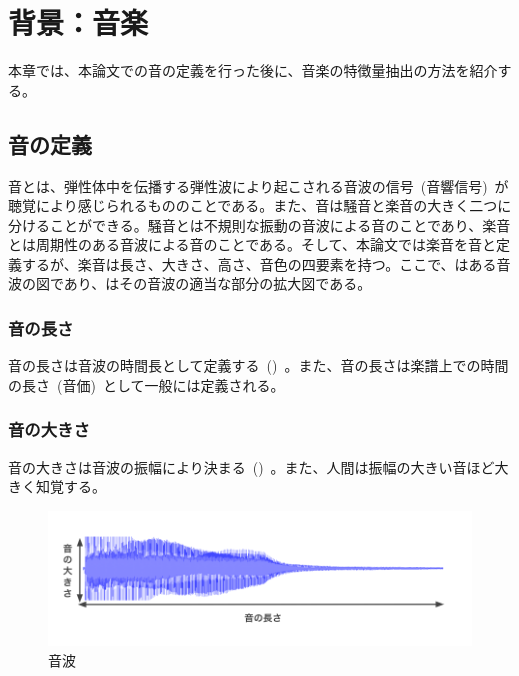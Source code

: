 \chapter{背景：音楽}

本章では、本論文での音の定義を行った後に、音楽の特徴量抽出の方法を紹介する。

\section{音の定義}

音とは、弾性体中を伝播する弾性波により起こされる音波の信号~(音響信号)~が聴覚により感じられるもののことである。また、音は騒音と楽音の大きく二つに分けることができる。騒音とは不規則な振動の音波による音のことであり、楽音とは周期性のある音波による音のことである。そして、本論文では楽音を音と定義するが、楽音は長さ、大きさ、高さ、音色の四要素を持つ。ここで、はある音波の図であり、はその音波の適当な部分の拡大図である。

\subsection{音の長さ}

音の長さは音波の時間長として定義する~()~。また、音の長さは楽譜上での時間の長さ~(音価)~として一般には定義される。

\subsection{音の大きさ}

音の大きさは音波の振幅により決まる~()~。また、人間は振幅の大きい音ほど大きく知覚する。

\begin{figure}[b]
\centering
\includegraphics[width=\columnwidth]{figure/gakuon1.png}
\caption{音波}
\label{fig:gakuon1}
\end{figure}

